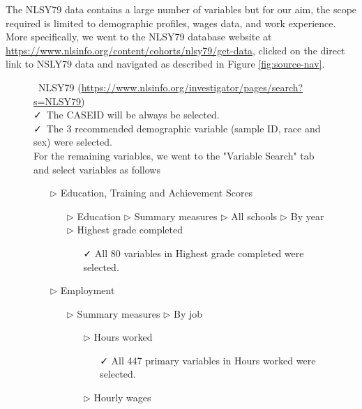 \documentclass{article}
\begin{document}
The NLSY79 data contains a large number of variables but for our aim, the scope required is limited to demographic profiles, wages data, and work experience. More specifically, we went to the NLSY79 database website at \url{https://www.nlsinfo.org/content/cohorts/nlsy79/get-data}, clicked on the direct link to NSLY79 data and navigated as described in Figure \ref{fig:source-nav}.

\begin{figure}[t]

\begin{tcolorbox}[title = Navigating the data source]
\faDatabase\ NLSY79 (\url{https://www.nlsinfo.org/investigator/pages/search?s=NLSY79})\\
\vspace{1mm}
\faCheck\ The CASEID will be always be selected.  \\
\vspace{1mm}
\faCheck\ The 3 recommended demographic variable (sample ID, race and sex) were selected.  \\
\vspace{1mm}
For the remaining variables, we went to the "Variable Search" tab and select variables as follows
\begin{itemize}
\item[$\triangleright$] Education, Training and Achievement Scores
\begin{itemize}
\item[$\triangleright$] Education $\triangleright$ Summary measures $\triangleright$ All schools $\triangleright$ By year $\triangleright$ Highest grade completed
\begin{itemize}
\item[\faCheck] All 80 variables in Highest grade completed were selected.
\end{itemize}
\end{itemize}
\item[$\triangleright$] Employment
\begin{itemize}
\item[$\triangleright$] Summary measures $\triangleright$ By job
\begin{itemize}
\item[$\triangleright$] Hours worked  
\begin{itemize}
\item[\faCheck] All 447 primary variables in Hours worked were selected.
\end{itemize}
\item[$\triangleright$] Hourly wages

\end{itemize}
\end{itemize}
\end{itemize}
\end{tcolorbox}
\end{figure}
\end{document}
